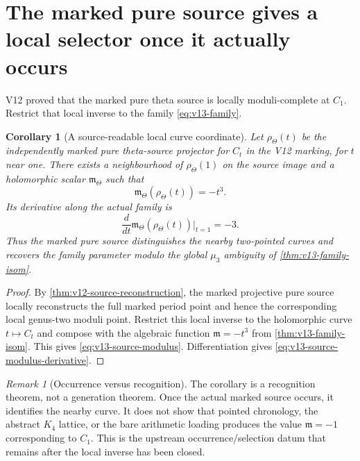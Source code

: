\documentclass[11pt]{article}
\newtheorem{corollary}[corollary]{Corollary}
\theoremstyle{definition}
\theoremstyle{remark}
\newtheorem{remark}[remark]{Remark}
\begin{document}
\section{The marked pure source gives a local selector once it actually occurs}
\label{sec:v13-source-selector}

V12 proved that the marked pure theta source is locally moduli-complete at
$C_1$.  Restrict that local inverse to the family \cref{eq:v13-family}.

\begin{corollary}[A source-readable local curve coordinate]
\label{cor:v13-source-modulus}
Let $\rho_\Theta(t)$ be the independently marked pure theta-source projector
for $C_t$ in the V12 marking, for $t$ near one.  There exists a neighbourhood
of $\rho_\Theta(1)$ on the source image and a holomorphic scalar
$\mathfrak m_\Theta$ such that
\begin{equation}
 \boxed{
 \mathfrak m_\Theta(\rho_\Theta(t))=-t^3.
 }
 \label{eq:v13-source-modulus}
\end{equation}
Its derivative along the actual family is
\begin{equation}
 \boxed{
 \frac{d}{dt}\mathfrak m_\Theta(\rho_\Theta(t))\bigg|_{t=1}=-3.
 }
 \label{eq:v13-source-modulus-derivative}
\end{equation}
Thus the marked pure source distinguishes the nearby two-pointed curves and
recovers the family parameter modulo the global $\mu_3$ ambiguity of
\cref{thm:v13-family-isom}.
\end{corollary}

\begin{proof}
By \cref{thm:v12-source-reconstruction}, the marked projective pure source
locally reconstructs the full marked period point and hence the corresponding
local genus-two moduli point.  Restrict this local inverse to the holomorphic
curve $t\mapsto C_t$ and compose with the algebraic function
$\mathfrak m=-t^3$ from \cref{thm:v13-family-isom}.  This gives
\cref{eq:v13-source-modulus}.  Differentiation gives
\cref{eq:v13-source-modulus-derivative}.
\end{proof}

\begin{remark}[Occurrence versus recognition]
The corollary is a recognition theorem, not a generation theorem.  Once the
actual marked source occurs, it identifies the nearby curve.  It does not show
that pointed chronology, the abstract $K_4$ lattice, or the bare arithmetic
loading produces the value $\mathfrak m=-1$ corresponding to $C_1$.
This is the upstream occurrence/selection datum that remains after the local
inverse has been closed.
\end{remark}
\end{document}
